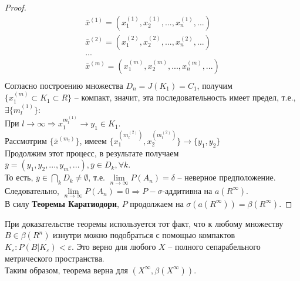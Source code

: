 \begin{proof}
\begin{displaymath}
\left. \begin{array}{l}
\bar{x}^{(1)}  = (x_1^{(1)},x_2^{(1)},...,x_n^{(1)},...)\\
\bar{x}^{(2)}  = (x_1^{(2)},x_2^{(2)},...,x_n^{(2)},...)\\
...\\
\bar{x}^{(m)}  = (x_1^{(m)},x_2^{(m)},...,x_n^{(m)},...)\\
\end{array} \right.
\end{displaymath}
Согласно построению множества $D_n=  J(K_1)= C_1$, получим $\{x_1^{(m)}\subset K_1 \subset R\}$ -- компакт, значит, эта последовательность имеет предел, т.е., $\exists \{m_l^{(1)}\} :$\\
При $l\rightarrow \infty\Rightarrow x_1^{m_l^{(1)}}\rightarrow y_1 \in K_1$.\\
Рассмотрим $\{\bar{x}^{(m_l)}\}$, имеем $\{x_1^{(m_l^{(2)})}, x_2^{(m_l^{(2)})}\}\rightarrow \{y_1, y_2\}$\\
Продолжим этот процесс, в результате получаем $\bar{y}=(y_1, y_2,...,y_m,...), \bar{y} \in D_k, \forall k$.\\
То есть, $\bar{y}\in \bigcap\limits_k D_k \ne \emptyset$, т.е. $\lim\limits_{n\rightarrow\infty}P(A_n)=\delta$ -- неверное предположение.\\
Следовательно, $\lim\limits_{n\rightarrow\infty}P(A_n)=0\Rightarrow P - \sigma$-аддитивна на $a(R^\infty)$.\\
В силу \textbf{Теоремы Каратиодори}, $P$ продолжаем на $\sigma (a (R^\infty))=\beta (R^\infty)$.
\end{proof}
\begin{remark}
При доказательстве теоремы используется тот факт, что к  любому множеству $B \in \beta (R^n)$ изнутри можно подобраться с помощью компактов $K_\varepsilon: P(B|K_\varepsilon) < \varepsilon$. Это верно для любого $X$ -- полного сепарабельного метрического пространства.\\
Таким образом, теорема верна для $(X^\infty, \beta(X^\infty))$.
\end{remark}

